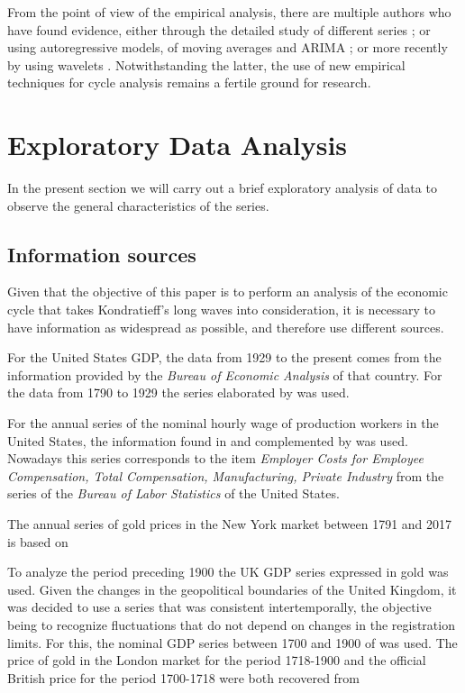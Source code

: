 \documentclass[a4paper]{article}
\begin{document}
From the point of view of the empirical analysis, there are multiple authors who have found evidence, either through the detailed study of different series \citep{kuznets1930secular, kondratieff1979long, schumpeter1939business}; or using autoregressive models, of moving averages and ARIMA \citep {hamilton1989new, kaiser2012measuring}; or more recently by using wavelets \citep {yogo2008measuring, soares2011business}. Notwithstanding the latter, the use of new empirical techniques for cycle analysis remains a fertile ground for research.

\section{Exploratory Data Analysis}

In the present section we will carry out a brief exploratory analysis of data to observe the general characteristics of the series.

\subsection{Information sources}

Given that the objective of this paper is to perform an analysis of the economic cycle that takes Kondratieff's long waves into consideration, it is necessary to have information as widespread as possible, and therefore use different sources.

For the United States GDP, the data from 1929 to the present comes from the information provided by the \textit{Bureau of Economic Analysis} of that country. For the data from 1790 to 1929 the series elaborated by \cite{johnston2018us} was used.

For the annual series of the nominal hourly wage of production workers in the United States, the information found in \cite{officer2009two} and complemented by \cite{Roesch2018} was used. Nowadays this series corresponds to the item \textit{Employer Costs for Employee Compensation, Total Compensation, Manufacturing, Private Industry} from the series of the \textit{Bureau of Labor Statistics} of the United States.

The annual series of gold prices in the New York market between 1791 and 2017 is based on \cite{officer2018gold}

To analyze the period preceding 1900 the UK GDP series expressed in gold was used. Given the changes in the geopolitical boundaries of the United Kingdom, it was decided to use a series that was consistent intertemporally, the objective being to recognize fluctuations that do not depend on changes in the registration limits. For this, the nominal GDP series between 1700 and 1900 of \cite{Williamson2018uk} was used. The price of gold in the London market for the period 1718-1900 and the official British price for the period 1700-1718 were both recovered from \cite{officer2018gold}
\end{document}
